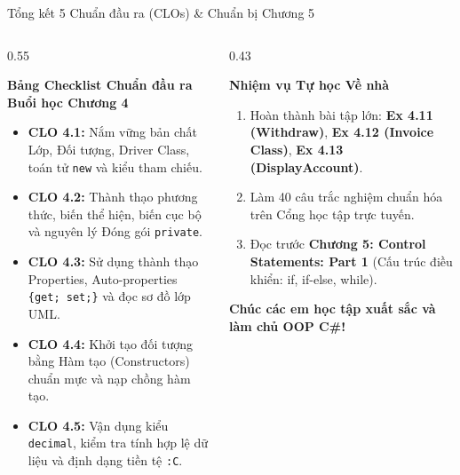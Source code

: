 \documentclass[aspectratio=169, 10pt]{beamer}
\begin{document}
\begin{frame}{Tổng kết 5 Chuẩn đầu ra (CLOs) \& Chuẩn bị Chương 5}
  \begin{columns}[T]
    \begin{column}{0.55\textwidth}
      \begin{block}{\textbf{Bảng Checklist Chuẩn đầu ra Buổi học Chương 4}}
        \begin{itemize}\small
          \item[\checkmark] \textbf{CLO 4.1:} Nắm vững bản chất Lớp, Đối tượng, Driver Class, toán tử \texttt{new} và kiểu tham chiếu.
          \item[\checkmark] \textbf{CLO 4.2:} Thành thạo phương thức, biến thể hiện, biến cục bộ và nguyên lý Đóng gói \texttt{private}.
          \item[\checkmark] \textbf{CLO 4.3:} Sử dụng thành thạo Properties, Auto-properties \texttt{\{get; set;\}} và đọc sơ đồ lớp UML.
          \item[\checkmark] \textbf{CLO 4.4:} Khởi tạo đối tượng bằng Hàm tạo (Constructors) chuẩn mực và nạp chồng hàm tạo.
          \item[\checkmark] \textbf{CLO 4.5:} Vận dụng kiểu \texttt{decimal}, kiểm tra tính hợp lệ dữ liệu và định dạng tiền tệ \texttt{:C}.
        \end{itemize}
      \end{block}
    \end{column}

    \begin{column}{0.43\textwidth}
      \begin{exampleblock}{\textbf{Nhiệm vụ Tự học Về nhà}}
        \begin{enumerate}\small
          \item Hoàn thành bài tập lớn: \textbf{Ex 4.11 (Withdraw)}, \textbf{Ex 4.12 (Invoice Class)}, \textbf{Ex 4.13 (DisplayAccount)}.
          \item Làm 40 câu trắc nghiệm chuẩn hóa trên Cổng học tập trực tuyến.
          \item Đọc trước \textbf{Chương 5: Control Statements: Part 1} (Cấu trúc điều khiển: if, if-else, while).
        \end{enumerate}
      \end{exampleblock}
      \begin{center}
        \footnotesize \textbf{Chúc các em học tập xuất sắc và làm chủ OOP C\#!}
      \end{center}
    \end{column}
  \end{columns}
\end{frame}
\end{document}
